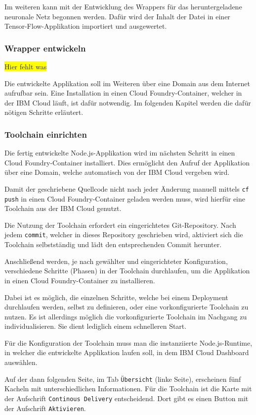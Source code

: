 Im weiteren kann mit der Entwicklung des Wrappers für das heruntergeladene neuronale Netz begonnen werden. Dafür wird
der Inhalt der Datei in einer Tensor-Flow-Applikation importiert und ausgewertet.

\subsubsection{Wrapper entwickeln}
\colorbox{yellow}{Hier fehlt was}

Die entwickelte Applikation soll im Weiteren über eine Domain aus dem Internet aufrufbar sein. Eine Installation in einen
Cloud Foundry-Container, welcher in der IBM Cloud läuft, ist dafür notwendig. Im folgenden Kapitel werden die dafür
nötigen Schritte erläutert.

\subsubsection{Toolchain einrichten}
Die fertig entwickelte Node.js-Applikation wird im nächsten Schritt in einen Cloud Foundry-Container installiert. Dies
ermöglicht den Aufruf der Applikation über eine Domain, welche automatisch von der IBM Cloud vergeben wird.

Damit der geschriebene Quellcode nicht nach jeder Änderung manuell mittels \texttt{cf push} in einen Cloud
Foundry-Container geladen werden muss, wird hierfür eine Toolchain aus der IBM Cloud genutzt.

Die Nutzung der Toolchain erfordert ein eingerichtetes Git-Repository. Nach jedem \texttt{commit}, welcher in dieses
Repository geschrieben wird, aktiviert sich die Toolchain selbstständig und lädt den entsprechenden Commit herunter.

Anschließend werden, je nach gewählter und eingerichteter Konfiguration, verschiedene Schritte (Phasen) in der Toolchain
durchlaufen, um die Applikation in einen Cloud Foundry-Container zu installieren.

Dabei ist es möglich, die einzelnen Schritte, welche bei einem Deployment durchlaufen werden, selbst zu definieren, oder
eine vorkonfigurierte Toolchain zu nutzen. Es ist allerdings möglich die vorkonfigurierte Toolchain im Nachgang zu
individualisieren. Sie dient lediglich einem schnelleren Start.

Für die Konfiguration der Toolchain muss man die instanziierte Node.js-Runtime, in welcher die entwickelte Applikation
laufen soll, in dem IBM Cloud Dashboard auswählen.

Auf der dann folgenden Seite, im Tab \texttt{Übersicht} (linke Seite), erscheinen fünf Kacheln mit unterschiedlichen
Informationen. Für die Toolchain ist die Karte mit der Aufschrift \texttt{Continous Delivery} entscheidend. Dort gibt es
einen Button mit der Aufschrift \texttt{Aktivieren}.

